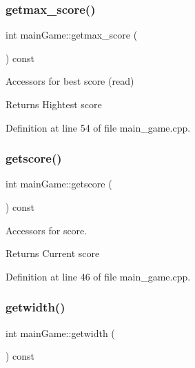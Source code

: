 \subsubsection{\texorpdfstring{getmax\+\_\+score()}{getmax\_score()}}
{\footnotesize\ttfamily int main\+Game\+::getmax\+\_\+score (\begin{DoxyParamCaption}{ }\end{DoxyParamCaption}) const}



Accessors for best score (read) 

\begin{DoxyReturn}{Returns}
Hightest score 
\end{DoxyReturn}


Definition at line 54 of file main\+\_\+game.\+cpp.

\hypertarget{classmain_game_a6f819a6a3433816a8f30a0e540f985a7}{}\label{classmain_game_a6f819a6a3433816a8f30a0e540f985a7} 
\subsubsection{\texorpdfstring{getscore()}{getscore()}}
{\footnotesize\ttfamily int main\+Game\+::getscore (\begin{DoxyParamCaption}{ }\end{DoxyParamCaption}) const}



Accessors for score. 

\begin{DoxyReturn}{Returns}
Current score 
\end{DoxyReturn}


Definition at line 46 of file main\+\_\+game.\+cpp.

\hypertarget{classmain_game_a3958ae533f81f1c40bd5e51589927777}{}\label{classmain_game_a3958ae533f81f1c40bd5e51589927777} 
\subsubsection{\texorpdfstring{getwidth()}{getwidth()}}
{\footnotesize\ttfamily int main\+Game\+::getwidth (\begin{DoxyParamCaption}{ }\end{DoxyParamCaption}) const}



